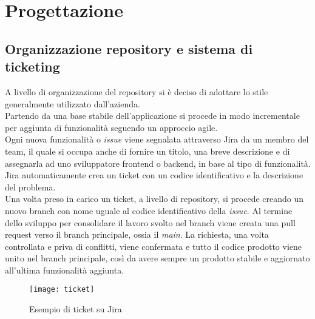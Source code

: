 
\chapter{Progettazione}
\label{cap:progettazione}
\section{Organizzazione repository e sistema di ticketing}
\label{sec:organizzazione-repository-sistema-ticketing}

A livello di organizzazione del repository si è deciso di adottare lo stile generalmente utilizzato dall'azienda.\\
Partendo da una base stabile dell'applicazione si procede in modo incrementale per aggiunta di funzionalità seguendo un approccio \gls{agile}.\\
Ogni nuova funzionalità o \textit{issue} viene segnalata attraverso Jira da un membro del team, il quale si occupa anche di fornire un titolo, una breve descrizione e di assegnarla ad uno sviluppatore frontend o backend, in base al tipo di funzionalità. Jira automaticamente crea un ticket con un codice identificativo e la descrizione del problema.\\
Una volta preso in carico un ticket, a livello di repository, si procede creando un nuovo \gls{branch} con nome uguale al codice identificativo della \textit{issue}. Al termine dello sviluppo per consolidare il lavoro svolto nel \gls{branch} viene creata una \gls{pull request} verso il \gls{branch} principale, ossia il \textit{main}. La richiesta, una volta controllata e priva di conflitti, viene confermata e tutto il codice prodotto viene unito nel \gls{branch} principale, così da avere sempre un prodotto stabile e aggiornato all'ultima funzionalità aggiunta.

\begin{figure}[ht]
    \centering
    \texttt{[image: ticket]}
    \caption{Esempio di ticket su Jira}
\end{figure}

